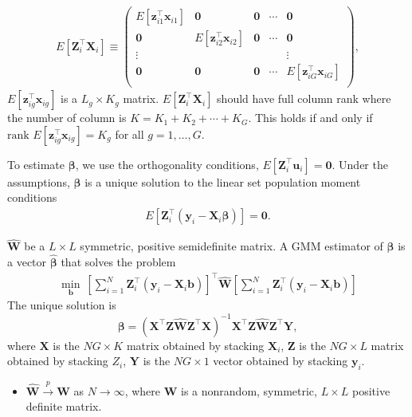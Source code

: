 \documentclass[11pt, a4paper]{article}
\numberwithin{figure}{section}
\theoremstyle{definition}
\newcommand{\0}{\mathbf{0}}
\newcommand{\rank}{\text{rank }}
\newcommand{\bmW}{\bm{W}}
\newcommand{\bmX}{\bm{X}}
\newcommand{\bmY}{\bm{Y}}
\newcommand{\bmZ}{\bm{Z}}
\newcommand{\bmb}{\bm{b}}
\newcommand{\bmu}{\bm{u}}
\newcommand{\bmx}{\bm{x}}
\newcommand{\bmy}{\bm{y}}
\newcommand{\bmz}{\bm{z}}
\begin{document}
\begin{align*}
    E[\bmZ_i^\top \bmX_i] \equiv
    \begin{pmatrix}
        E[\bmz_{i1}^\top \bmx_{i1}] & \bm0 & \bm0 & \cdots & \bm0\\
        \bm0 & E[\bmz_{i2}^\top \bmx_{i2}] & \bm0 & \cdots & \bm0\\
        \vdots &  &  &  & \vdots\\
        \bm0 & \bm0 & \bm0 & \cdots & E[\bmz_{iG}^\top \bmx_{iG}]\\
    \end{pmatrix},
\end{align*}
$E[\bmz_{ig}^\top \bmx_{ig}]$ is a $L_g\times K_g$ matrix. $ E[\bmZ_i^\top \bmX_i]$ should have full column rank where the number of column is $K = K_1 + K_2 + \cdots +K_G$. This holds if and only if $\rank E[\bmz_{ig}^\top \bmx_{ig}] = K_g $ for all $g = 1,\ldots, G$.

To estimate $\bm{\beta}$, we use the orthogonality conditions, $E[\bmZ_i^\top \bmu_i] = \bm0$. Under the assumptions, $\bm{\beta}$ is a unique solution to the linear set population moment conditions
\begin{align*}
    E[\bmZ_i^\top (\bmy_i - \bmX_i \bm{\beta})] = \bm0.
\end{align*}


$\hat{\bmW}$ be a $L\times L$ symmetric, positive  semidefinite matrix. A  GMM estimator of $\bm{\beta}$ is a vector $\hat{\bm{\beta}}$ that solves the problem 
\begin{align*}
    \min_{\bmb}\ \left[ \sum_{i=1}^N \bmZ_i^\top (\bmy_i - \bmX_i \bmb)  \right]^\top \hat{\bmW} \left[ \sum_{i=1}^N \bmZ_i^\top (\bmy_i - \bmX_i \bmb)  \right]
\end{align*}
The unique solution is 
\[ \bm{\beta} = (\bmX^\top\bmZ\hat{\bmW}\bmZ^\top\bmX)^{-1}\bmX^\top\bmZ\hat{\bmW}\bmZ^\top\bmY,\]
where $\bmX$ is the $NG\times K$ matrix obtained by stacking $\bmX_i$, $\bmZ$ is the $NG\times L$ matrix obtained by stacking $Z_i$, $\bmY$ is the $NG\times 1 $ vector obtained by stacking $\bmy_i$.

\begin{itemize}
    \item $\hat{\bmW} \overset{p}{\rightarrow} \bmW$ as $N\rightarrow \infty$, where $\bmW$ is a nonrandom, symmetric, $L\times L$ positive definite matrix.  
\end{itemize}
\end{document}
